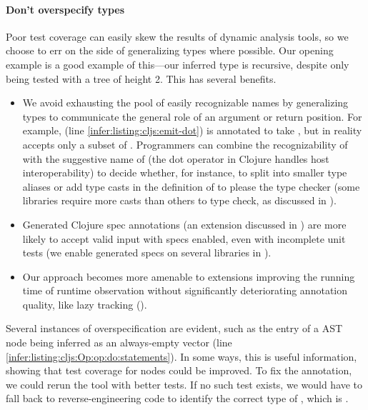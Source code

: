 \paragraph{Don't overspecify types}
Poor test coverage can easily skew the results of dynamic analysis tools,
so we choose to err on the side of generalizing types
where possible.
Our opening example 
is a good example of this---our inferred type
is recursive, despite  only being tested with a tree of height 2.
This has several benefits.
\begin{itemize}
  \item We avoid exhausting the pool of easily recognizable names
    by generalizing types to communicate the general role
    of an argument or return position.
    For example,  (line \ref{infer:listing:cljs:emit-dot})
    is annotated to take , but in reality accepts only a subset
    of .
    Programmers can combine the recognizability of  with the
    suggestive name of  (the dot operator in Clojure handles host interoperability) to decide whether, for instance,
    to split  into smaller type aliases
    or add type casts in the definition of  to please 
    the type checker
    (some libraries require more casts than others to type check, as discussed in ).
  \item Generated Clojure spec annotations (an extension discussed in )
        are more likely to accept valid input with specs enabled, even with incomplete unit tests
        (we enable generated specs on several libraries in ).
  \item Our approach becomes more amenable to extensions improving the running time
        of runtime observation without significantly deteriorating annotation quality,
        like lazy tracking ().
\end{itemize}

Several instances of overspecification are evident,
such as the  entry of a  AST node being inferred as an always-empty vector
(line \ref{infer:listing:cljs:Op:op:do:statements}).
In some ways, this is useful information, showing that
test coverage for  nodes could be improved.
To fix the annotation, we could rerun the tool with better tests.
If no such test exists, we would have to fall back
to reverse-engineering code to identify the correct
type of , which is .

